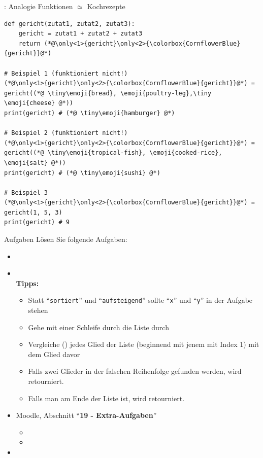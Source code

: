 \begin{frame}[fragile]{: Analogie }
Funktionen $\simeq$ Kochrezepte

\begin{lstlisting}
def gericht(zutat1, zutat2, zutat3):
    gericht = zutat1 + zutat2 + zutat3
    return (*@\only<1>{gericht}\only<2>{\colorbox{CornflowerBlue}{gericht}}@*)

# Beispiel 1 (funktioniert nicht!)
(*@\only<1>{gericht}\only<2>{\colorbox{CornflowerBlue}{gericht}}@*) = gericht((*@ \tiny\emoji{bread}, \emoji{poultry-leg},\tiny \emoji{cheese} @*))
print(gericht) # (*@ \tiny\emoji{hamburger} @*)

# Beispiel 2 (funktioniert nicht!)
(*@\only<1>{gericht}\only<2>{\colorbox{CornflowerBlue}{gericht}}@*) = gericht((*@ \tiny\emoji{tropical-fish}, \emoji{cooked-rice}, \emoji{salt} @*))
print(gericht) # (*@ \tiny\emoji{sushi} @*)

# Beispiel 3    
(*@\only<1>{gericht}\only<2>{\colorbox{CornflowerBlue}{gericht}}@*) = gericht(1, 5, 3)
print(gericht) # 9
\end{lstlisting}
\end{frame}

\begin{frame}{Aufgaben}
	Lösen Sie folgende Aufgaben:
	\begin{itemize}
	    \item {}
	    \item {}\\
	    \textbf{Tipps:}
	    	    \begin{itemize}
	    	    	\item {} Statt ``\texttt{sortiert}'' und ``\texttt{aufsteigend}'' sollte ``\texttt{x}'' und ``\texttt{y}'' in der Aufgabe stehen
	    	    	\item Gehe mit einer Schleife durch die Liste durch
	    	    	\item Vergleiche () jedes Glied der Liste (beginnend mit jenem mit Index 1) mit dem Glied davor
	    	    	\item Falls zwei Glieder in der falschen Reihenfolge gefunden werden, wird  retourniert.
	    	    	\item Falls man am Ende der Liste ist, wird  retourniert.
	    	    \end{itemize}
	    \item Moodle, Abschnitt ``\textbf{19 -  Extra-Aufgaben}''
	    \begin{itemize}
	    \item {}
	    \item {}
	    \end{itemize}
	    \item {}
	\end{itemize}
\end{frame}